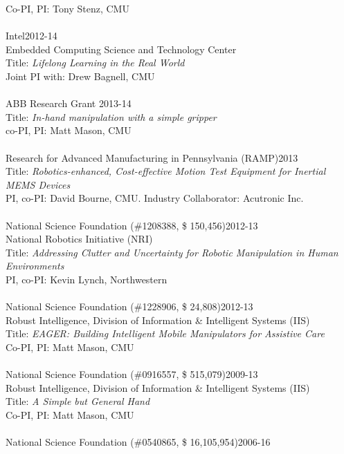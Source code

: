 Co-PI, PI: Tony Stenz, CMU\\
\\
Intel\hfill 2012-14\\
Embedded Computing Science and Technology Center\\
Title: \textit{Lifelong Learning in the Real World}\\
Joint PI with: Drew Bagnell, CMU\\
\\
ABB Research Grant \hfill 2013-14\\
Title: \textit{In-hand manipulation with a simple gripper}\\
co-PI, PI: Matt Mason, CMU\\
\\
Research for Advanced Manufacturing in Pennsylvania (RAMP)\hfill 2013\\
Title: \textit{Robotics-enhanced, Cost-effective Motion Test Equipment for Inertial MEMS Devices}\\
PI, co-PI: David Bourne, CMU. Industry Collaborator: Acutronic Inc.\\
\\
National Science Foundation (\#1208388, \$ 150,456)\hfill 2012-13\\
National Robotics Initiative (NRI)\\
Title: \textit{Addressing Clutter and Uncertainty for Robotic Manipulation in Human Environments}\\
PI, co-PI: Kevin Lynch, Northwestern\\
\\
National Science Foundation (\#1228906, \$ 24,808)\hfill 2012-13\\
Robust Intelligence, Division of Information \& Intelligent Systems (IIS)\\
Title: \textit{ EAGER: Building Intelligent Mobile Manipulators for Assistive Care
}\\
Co-PI, PI: Matt Mason, CMU\\
\\
National Science Foundation (\#0916557, \$ 515,079)\hfill 2009-13\\
Robust Intelligence, Division of Information \& Intelligent Systems (IIS)\\
Title: \textit{A Simple but General Hand}\\
Co-PI, PI: Matt Mason, CMU\\
\\
National Science Foundation (\#0540865, \$ 16,105,954)\hfill 2006-16\\
